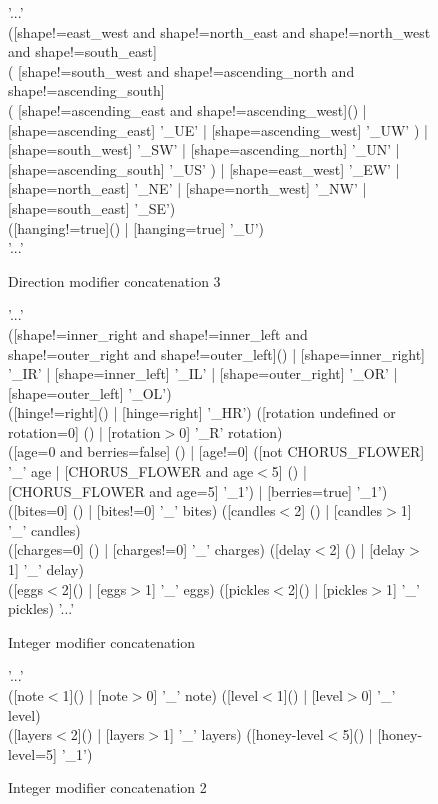 \begin{subfigures}
	\begin{figure}
		\begin{rail}
			'...' \\
			([shape!=east\_west and shape!=north\_east and shape!=north\_west and shape!=south\_east] \\ (
				[shape!=south\_west and shape!=ascending\_north and shape!=ascending\_south] \\ (
					[shape!=ascending\_east and shape!=ascending\_west]() |
					[shape=ascending\_east] '\_UE' |
					[shape=ascending\_west] '\_UW'
				) |
				[shape=south\_west] '\_SW' |
				[shape=ascending\_north] '\_UN' |
				[shape=ascending\_south] '\_US'
			) |
			[shape=east\_west] '\_EW' |
			[shape=north\_east] '\_NE' |
			[shape=north\_west] '\_NW' |
			[shape=south\_east] '\_SE') \\
			([hanging!=true]() | [hanging=true] '\_U') \\
			'...'
		\end{rail}
		\caption{Direction modifier concatenation 3}
	\end{figure}
	
	\begin{figure}
		\begin{rail}
			'...' \\
			([shape!=inner\_right and shape!=inner\_left and shape!=outer\_right and shape!=outer\_left]() | [shape=inner\_right] '\_IR' | [shape=inner\_left] '\_IL' | [shape=outer\_right] '\_OR' | [shape=outer\_left] '\_OL') \\
			([hinge!=right]() | [hinge=right] '\_HR')
			([rotation undefined or rotation=0] () | [rotation$>$0] '\_R' rotation) \\
			([age=0 and berries=false] () | [age!=0] ([not CHORUS\_FLOWER] '\_' age | [CHORUS\_FLOWER and age$<$5] () | [CHORUS\_FLOWER and age=5] '\_1') | [berries=true] '\_1') \\
			([bites=0] () | [bites!=0] '\_' bites) ([candles$<$2] () | [candles$>$1] '\_' candles) \\
			([charges=0] () | [charges!=0] '\_' charges) ([delay$<$2] () | [delay$>$1] '\_' delay) \\
			([eggs$<$2]() | [eggs$>$1] '\_' eggs) ([pickles$<$2]() | [pickles$>$1] '\_' pickles)
			'...'
		\end{rail}
		\caption{Integer modifier concatenation}
	\end{figure}
	
	\begin{figure}
		\begin{rail}
			'...' \\
			([note$<$1]() | [note$>$0] '\_' note) ([level$<$1]() | [level$>$0] '\_' level) \\
			([layers$<$2]() | [layers$>$1] '\_' layers) ([honey-level$<$5]() | [honey-level=5] '\_1')
		\end{rail}
		\caption{Integer modifier concatenation 2}
	\end{figure}
\end{subfigures}
\fi